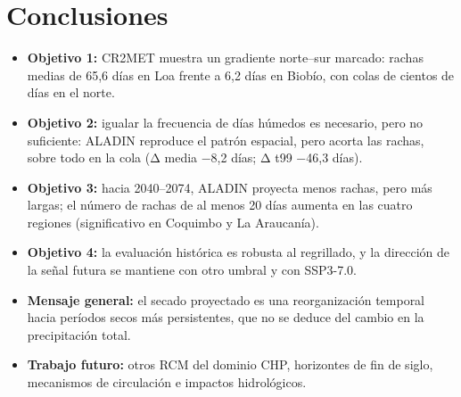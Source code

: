 \chapter{Conclusiones}\label{cap:7}


\begin{itemize}
\tightlist
\item
  \textbf{Objetivo 1:} CR2MET muestra un gradiente norte--sur marcado: rachas medias de 65,6 días en Loa frente a 6,2 días en Biobío, con colas de cientos de días en el norte.
\item
  \textbf{Objetivo 2:} igualar la frecuencia de días húmedos es necesario, pero no suficiente: ALADIN reproduce el patrón espacial, pero acorta las rachas, sobre todo en la cola (Δ media −8,2 días; Δ t99 −46,3 días).
\item
  \textbf{Objetivo 3:} hacia 2040--2074, ALADIN proyecta menos rachas, pero más largas; el número de rachas de al menos 20 días aumenta en las cuatro regiones (significativo en Coquimbo y La Araucanía).
\item
  \textbf{Objetivo 4:} la evaluación histórica es robusta al regrillado, y la dirección de la señal futura se mantiene con otro umbral y con SSP3-7.0.
\item
  \textbf{Mensaje general:} el secado proyectado es una reorganización temporal hacia períodos secos más persistentes, que no se deduce del cambio en la precipitación total.
\item
  \textbf{Trabajo futuro:} otros RCM del dominio CHP, horizontes de fin de siglo, mecanismos de circulación e impactos hidrológicos.
\end{itemize}
